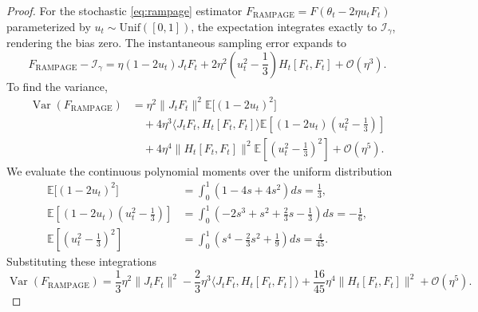 \documentclass[letter,11pt]{article}
\begin{document}
\begin{proof}
For the stochastic \eqref{eq:rampage} estimator $F_{\text{RAMPAGE}} = F(\theta_t - 2\eta u_t F_t)$ parameterized by $u_t \sim \mathrm{Unif}([0,1])$, the expectation integrates exactly to $\mathcal{I}_{\gamma}$, rendering the bias zero. The instantaneous sampling error expands to
\begin{equation} \label{eq:rampage_full_error}
F_{\text{RAMPAGE}} - \mathcal{I}_{\gamma} = \eta (1 - 2u_t) J_t F_t + 2\eta^2 \left( u_t^2 - \frac{1}{3} \right) H_t[F_t, F_t] + \mathcal{O}(\eta^3).
\end{equation}
To find the variance,
\begin{equation}
\begin{aligned}
\operatorname{Var}(F_{\text{RAMPAGE}}) &= \eta^2 \|J_t F_t\|^2 \mathbb{E}\big[ (1 - 2u_t)^2 \big] \\
&\quad + 4\eta^3 \langle J_t F_t, H_t[F_t, F_t] \rangle \mathbb{E}\left[ (1 - 2u_t)\left(u_t^2 - \frac{1}{3}\right) \right] \\
&\quad + 4\eta^4 \|H_t[F_t, F_t]\|^2 \mathbb{E}\left[ \left(u_t^2 - \frac{1}{3}\right)^2 \right] + \mathcal{O}(\eta^5).
\end{aligned}
\end{equation}
We evaluate the continuous polynomial moments over the uniform distribution
\begin{equation}
\begin{aligned}
\mathbb{E}\big[ (1 - 2u_t)^2 \big] &= \int_0^1 (1 - 4s + 4s^2) ds = \frac{1}{3}, \\
\mathbb{E}\left[ (1 - 2u_t)\left(u_t^2 - \frac{1}{3}\right) \right] &= \int_0^1 \left( -2s^3 + s^2 + \frac{2}{3}s - \frac{1}{3} \right) ds = -\frac{1}{6}, \\
\mathbb{E}\left[ \left(u_t^2 - \frac{1}{3}\right)^2 \right] &= \int_0^1 \left( s^4 - \frac{2}{3}s^2 + \frac{1}{9} \right) ds = \frac{4}{45}.
\end{aligned}
\end{equation}
Substituting these integrations
\begin{equation}
\operatorname{Var}(F_{\text{RAMPAGE}}) = \frac{1}{3}\eta^2 \|J_t F_t\|^2 - \frac{2}{3}\eta^3 \langle J_t F_t, H_t[F_t, F_t] \rangle + \frac{16}{45}\eta^4 \|H_t[F_t, F_t]\|^2 + \mathcal{O}(\eta^5).
\end{equation}


\end{proof}
\end{document}
